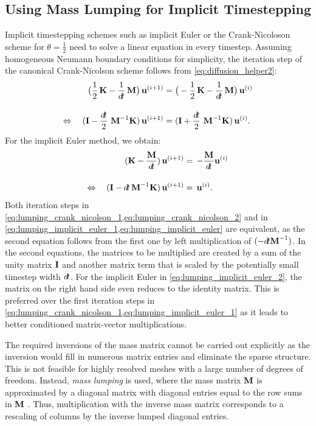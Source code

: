 \subsection{Using Mass Lumping for Implicit Timestepping}\label{sec:mass_lumping}
Implicit timestepping schemes such as implicit Euler or the Crank-Nicoloson scheme for $\theta=\frac12$ need to solve a linear equation in every timestep.
Assuming homogeneous Neumann boundary conditions for simplicity, the iteration step of the canonical Crank-Nicolson scheme follows from \cref{eq:diffusion_helper2}:
\begin{subequations}\label{eq:lumping_crank_nicolson}
  \begin{align}
    \big(\dfrac1{2}\bfK-\dfrac{1}{\dt}\bfM\big)\, \bfu^{(i+1)} &= \big(-\dfrac12{\bfK} - \dfrac{1}{\dt}\bfM\big)\, \bfu^{(i)}\label{eq:lumping_crank_nicolson_1}\\[4mm]
    \Leftrightarrow \quad (\bfI - \dfrac{\dt}{2}\,\bfM^{-1}\bfK)\,\bfu^{(i+1)}&= (\bfI + \dfrac{\dt}{2}\,\bfM^{-1}\bfK)\,\bfu^{(i)}.\label{eq:lumping_crank_nicolson_2}
  \end{align}
\end{subequations}
For the implicit Euler method, we obtain:%
\begin{subequations}\label{eq:lumping_implicit_euler}
  \begin{align}
    \ds(\bfK-\frac{\bfM}{\dt})\,\bfu^{(i+1)} &=\,\ds -\frac{\bfM}{\dt}\bfu^{(i)}\label{eq:lumping_implicit_euler_1}\\[4mm]
    \Leftrightarrow \quad (\bfI - \dt\,\bfM^{-1}\bfK)\,\bfu^{(i+1)}&= \,\bfu^{(i)}.\label{eq:lumping_implicit_euler_2}
  \end{align}
\end{subequations}
Both iteration steps in \cref{eq:lumping_crank_nicolson_1,eq:lumping_crank_nicolson_2} and in \cref{eq:lumping_implicit_euler_1,eq:lumping_implicit_euler} are equivalent, as the second equation follows from the first one by left multiplication of $(-\dt \bfM^{-1})$. In the second equations, the matrices to be multiplied are created by a sum of the unity matrix $\textbf{I}$ and another matrix term that is scaled by the potentially small timestep width $\dt$. For the implicit Euler in \cref{eq:lumping_implicit_euler_2}, the matrix on the right hand side even reduces to the identity matrix. This is preferred over the first iteration steps in \cref{eq:lumping_crank_nicolson_1,eq:lumping_implicit_euler_1} as it leads to better conditioned matrix-vector multiplications.

The required inversions of the mass matrix cannot be carried out explicitly as the inversion would fill in numerous matrix entries and eliminate the sparse structure. This is not feasible for highly resolved meshes with a large number of degrees of freedom. Instead, \emph{mass lumping} is used, where the mass matrix $\textbf{M}$ is approximated by a diagonal matrix with diagonal entries equal to the row sums in $\textbf{M}$ \cite{Hinton1976}. Thus, multiplication with the inverse mass matrix corresponds to a rescaling of columns by the inverse lumped diagonal entries.

